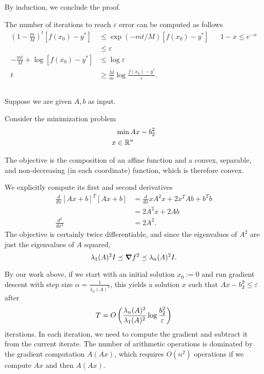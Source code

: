 \documentclass[10pt]{article}
\let\norm\relax
\DeclarePairedDelimiter{\norm}{\lVert}{\rVert}
\newcommand{\R}{\mathbb{R}}
\begin{document}
By induction,
we conclude the proof.

The number of iterations to reach $\varepsilon$ error can be computed as follows
\begin{align*}
  \left( 1-\frac{m}M \right)^t [f(x_0) - y^*]
  &\leq \exp(-mt/M) [f(x_0) - y^*] &&1-x\leq e^{-x} \\
  &\leq \varepsilon \\
  -\frac{mt}{M} + \log[f(x_0) - y^*] &\leq \log \varepsilon \\
  t &\geq \frac{M}{m} \log\frac{f(x_0) - y^*}{\varepsilon}.
\end{align*}

\subsection{}
Suppose we are given $A, b$ as input.

Consider the minimization problem
\begin{align*}
  &\min \norm{Ax - b}_2^2 \\
  x &\in \R^n
\end{align*}

The objective is the composition of an affine function
and a convex, separable, and non-decreasing (in each coordinate) function,
which is therefore convex.

We explicitly compute its first and second derivatives
\begin{align*}
  \frac{d}{dx} [Ax+b]^T[Ax + b]
  &= \frac{d}{dx} xA^2x + 2x^TAb + b^Tb \\
  &= 2 A^2x + 2Ab \\
  \frac{d^2}{dx^2}
  &= 2A^2.
\end{align*}
The objective is certainly twice differentiable,
and since the eigenvalues of $A^2$ are just the eigenvalues of $A$ squared,
\[
  \lambda_1(A)^2 I\preceq \grad f^2 \preceq \lambda_n(A)^2 I.
\]

By our work above,
if we start with an initial solution $x_0 := 0$
and run gradient descent with step size $\alpha = \frac1{\lambda_n(A)^2}$,
this yields a solution $x$ such that $\norm{Ax-b}_2^2 \leq \varepsilon$ after
\[
  T = O\left( \frac{\lambda_n(A)^2}{\lambda_1(A)^2} \log\frac{\norm{b}_2^2}{\varepsilon} \right)
\]
iterations.
In each iteration,
we need to compute the gradient and subtract it from the current iterate.
The number of arithmetic operations is dominated by the gradient computation $A(Ax)$,
which requires $O(n^2)$ operations if we compute $Ax$ and then $A(Ax)$.
\end{document}
